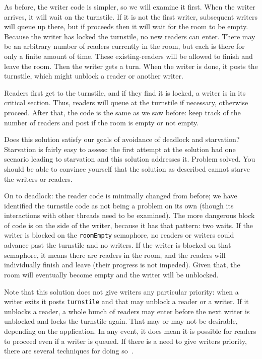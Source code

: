 \documentclass[a4paper]{report}
\begin{document}
As before, the writer code is simpler, so we will examine it first. When the writer arrives, it will wait on the turnstile. If it is not the first writer, subsequent writers will queue up there, but if proceeds then it will wait for the room to be empty. Because the writer has locked the turnstile, no new readers can enter. There may be an arbitrary number of readers currently in the room, but each is there for only a finite amount of time. These existing-readers will be allowed to finish and leave the room. Then the writer gets a turn. When the writer is done, it posts the turnstile, which might unblock a reader or another writer.

Readers first get to the turnstile, and if they find it is locked, a writer is in its critical section. Thus, readers will queue at the turnstile if necessary, otherwise proceed. After that, the code is the same as we saw before: keep track of the number of readers and post if the room is empty or not empty.

Does this solution satisfy our goals of avoidance of deadlock and starvation? Starvation is fairly easy to assess: the first attempt at the solution had one scenario leading to starvation and this solution addresses it. Problem solved. You should be able to convince yourself that the solution as described cannot starve the writers or readers.

On to deadlock: the reader code is minimally changed from before; we have identified the turnstile code as not being a problem on its own (though its interactions with other threads need to be examined). The more dangerous block of code is on the side of the writer, because it has that pattern: two waits. If the writer is blocked on the \texttt{roomEmpty} semaphore, no readers or writers could advance past the turnstile and no writers. If the writer is blocked on that semaphore, it means there are readers in the room, and the readers will individually finish and leave (their progress is not impeded). Given that, the room will eventually become empty and the writer will be unblocked.


Note that this solution does not give writers any particular priority: when a writer exits it posts \texttt{turnstile} and that may unblock a reader or a writer. If it unblocks a reader, a whole bunch of readers may enter before the next writer is unblocked and locks the turnstile again. That may or may not be desirable, depending on the application. In any event, it does mean it is possible for readers to proceed even if a writer is queued. If there is a need to give writers priority, there are several techniques for doing so~\cite{lbs}.
\end{document}
